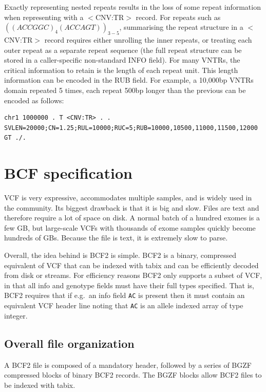\documentclass[8pt]{article}
\begin{document}
Exactly representing nested repeats results in the loss of some repeat information when representing with a $<$CNV:TR$>$ record.
For repeats such as $((ACCGGC)_{4}(ACCAGT))_{3-5}$, summarising the repeat structure in a $<$CNV:TR$>$ record requires either unrolling the inner repeats, or treating each outer repeat as a separate repeat sequence (the full repeat structure can be stored in a caller-specific non-standard INFO field).
For many VNTRs, the critical information to retain is the length of each repeat unit.
This length information can be encoded in the RUB field.
For example, a 10,000bp VNTRs domain repeated 5 times, each repeat 500bp longer than the previous can be encoded as follows:

\footnotesize
\begin{verbatim}
chr1 1000000 . T <CNV:TR> . . SVLEN=20000;CN=1.25;RUL=10000;RUC=5;RUB=10000,10500,11000,11500,12000 GT ./.
\end{verbatim}
\normalsize


	
	
\pagebreak
\section{BCF specification}

VCF is very expressive, accommodates multiple samples, and is widely used in the community.
Its biggest drawback is that it is big and slow.
Files are text and therefore require a lot of space on disk.
A normal batch of a hundred exomes is a few GB, but large-scale VCFs with thousands of exome samples quickly become hundreds of GBs.
Because the file is text, it is extremely slow to parse.

Overall, the idea behind is BCF2 is simple.
BCF2 is a binary, compressed equivalent of VCF that can be indexed with tabix and can be efficiently decoded from disk or streams.
For efficiency reasons BCF2 only supports a subset of VCF, in that all info and genotype fields must have their full types specified.
That is, BCF2 requires that if e.g.\ an info field {\tt AC} is present then it must contain an equivalent VCF header line noting that {\tt AC} is an allele indexed array of type integer.

\subsection{Overall file organization}

A BCF2 file is composed of a mandatory header, followed by a series of BGZF compressed blocks of binary BCF2 records.
The BGZF blocks allow BCF2 files to be indexed with tabix.
\end{document}
